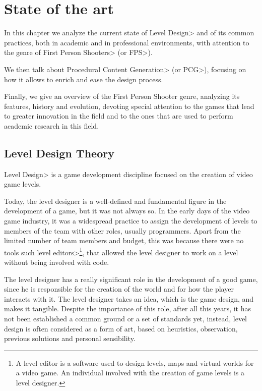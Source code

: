 \chapter{State of the art}


In this chapter we analyze the current state of \<Level Design> and of its common practices, both in academic and in professional environments, with attention to the genre of \<First Person Shooters> (or \<FPS>).

\par

We then talk about \<Procedural Content Generation> (or \<PCG>), focusing on how it allows to enrich and ease the design process.

\par

Finally, we give an overview of the First Person Shooter genre, analyzing its features, history and evolution, devoting special attention to the games that lead to greater innovation in the field and to the ones that are used to perform academic research in this field.


\section{Level Design Theory}

\<Level Design> is a game development discipline focused on the creation of video game levels.

\par

Today, the level designer is a well-defined and fundamental figure in the development of a game, but it was not always so. In the early days of the video game industry, it was a widespread practice to assign the development of levels to members of the team with other roles, usually programmers. Apart from the limited number of team members and budget, this was because there were no tools such \<level editors>\footnote{\label{levelEditorFootnote}A level editor is a software used to design levels, maps and virtual worlds for a video game. An individual involved with the creation of game levels is a level designer.}, that allowed the level designer to work on a level without being involved with code.

\par

The level designer has a really significant role in the development of a good game, since he is responsible for the creation of the world and for how the player interacts with it. The level designer takes an idea, which is the game design, and makes it tangible.
Despite the importance of this role, after all this years, it has not been established a common ground or a set of standards yet, instead, level design is often considered as a form of art, based on heuristics, observation, previous solutions and personal sensibility.


